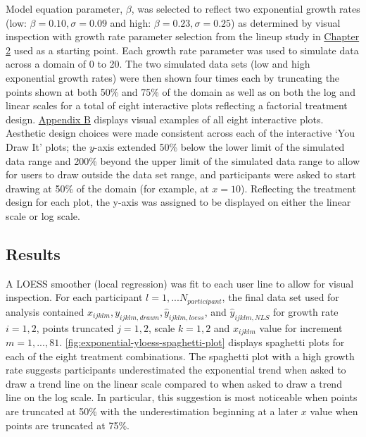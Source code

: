 \documentclass[print]{nuthesis}
\begin{document}
Model equation parameter, \(\beta\), was selected to reflect two exponential growth rates (low: \(\beta = 0.10, \sigma = 0.09\) and high: \(\beta = 0.23, \sigma = 0.25\)) as determined by visual inspection with growth rate parameter selection from the lineup study in \protect\hyperlink{lineups-parameter-selection}{Chapter 2} used as a starting point.
Each growth rate parameter was used to simulate data across a domain of 0 to 20.
The two simulated data sets (low and high exponential growth rates) were then shown four times each by truncating the points shown at both 50\% and 75\% of the domain as well as on both the log and linear scales for a total of eight interactive plots reflecting a factorial treatment design.
\protect\hyperlink{exponential-prediction-plots}{Appendix B} displays visual examples of all eight interactive plots.
Aesthetic design choices were made consistent across each of the interactive `You Draw It' plots; the \(y\)-axis extended 50\% below the lower limit of the simulated data range and 200\% beyond the upper limit of the simulated data range to allow for users to draw outside the data set range, and participants were asked to start drawing at 50\% of the domain (for example, at \(x = 10\)).
Reflecting the treatment design for each plot, the y-axis was assigned to be displayed on either the linear scale or log scale.

\hypertarget{results-2}{%
\subsection{Results}\label{results-2}}

A LOESS smoother (local regression) was fit to each user line to allow for visual inspection.
For each participant \(l = 1,...N_{participant}\), the final data set used for analysis contained \(x_{ijklm}, y_{ijklm,drawn}, \hat y_{ijklm,loess}\), and \(\hat y_{ijklm,NLS}\) for growth rate \(i = 1,2\), points truncated \(j = 1,2\), scale \(k = 1,2\) and \(x_{ijklm}\) value for increment \(m = 1, ...,81\).
\cref{fig:exponential-yloess-spaghetti-plot} displays spaghetti plots for each of the eight treatment combinations.
The spaghetti plot with a high growth rate suggests participants underestimated the exponential trend when asked to draw a trend line on the linear scale compared to when asked to draw a trend line on the log scale.
In particular, this suggestion is most noticeable when points are truncated at 50\% with the underestimation beginning at a later \(x\) value when points are truncated at 75\%.
\end{document}
